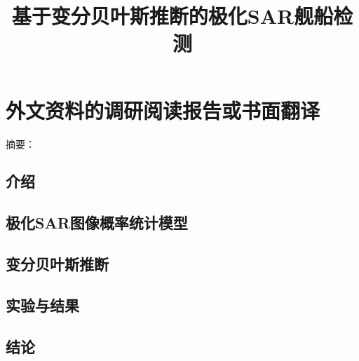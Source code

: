 
\chapter{外文资料的调研阅读报告或书面翻译}

\title{基于变分贝叶斯推断的极化SAR舰船检测}

{\heiti 摘要：}
\section{介绍}
\section{极化SAR图像概率统计模型}
\section{变分贝叶斯推断}
\section{实验与结果}
\section{结论}

